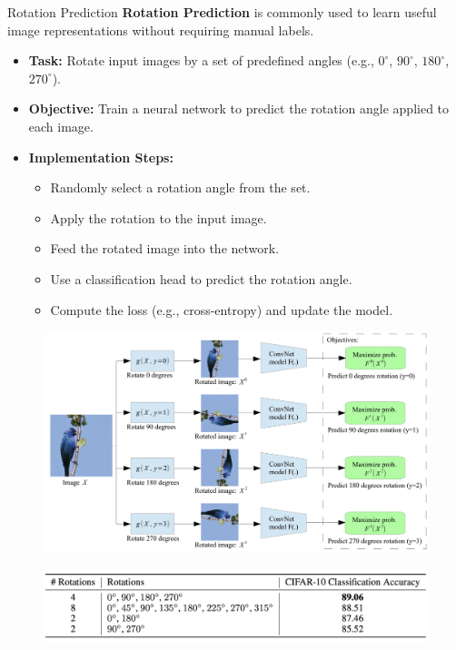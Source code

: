 \begin{frame}[allowframebreaks]{Rotation Prediction}
    \textbf{Rotation Prediction} is commonly used to learn useful image representations without requiring manual labels.
    \begin{itemize}
        \item \textbf{Task:} Rotate input images by a set of predefined angles (e.g., $0^\circ$, $90^\circ$, $180^\circ$, $270^\circ$).
        \item \textbf{Objective:} Train a neural network to predict the rotation angle applied to each image.
        \item \textbf{Implementation Steps:}
        \begin{itemize}
            \item Randomly select a rotation angle from the set.
            \item Apply the rotation to the input image.
            \item Feed the rotated image into the network.
            \item Use a classification head to predict the rotation angle.
            \item Compute the loss (e.g., cross-entropy) and update the model.
        \end{itemize}
    \end{itemize}

    \framebreak

    \begin{figure}
        \flushleft
        \includegraphics[width=1\linewidth,height=\textheight,keepaspectratio]{images/ssl/slide_33_1_img.png}
    \end{figure}

    \framebreak

    \begin{figure}
        \flushleft
        \includegraphics[width=1\linewidth,height=\textheight,keepaspectratio]{images/ssl/slide_34_1_img.png}
    \end{figure}


\end{frame}
